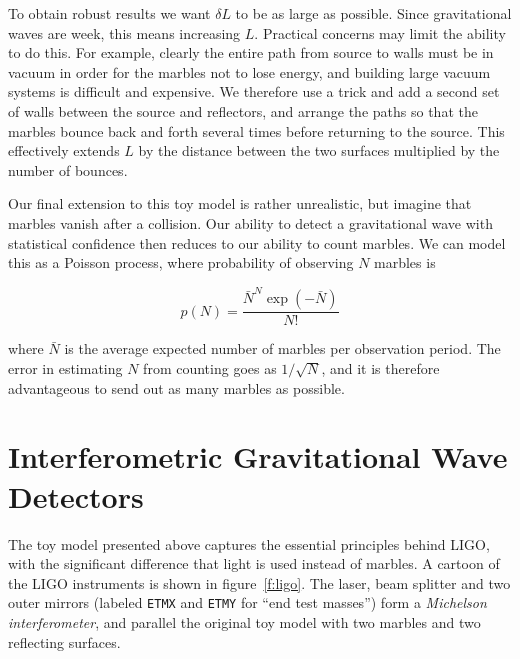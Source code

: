 To obtain robust results we want $\delta L$ to be as large as
possible.  Since gravitational waves are week, this means increasing
$L$.  Practical concerns may limit the ability to do this.  For
example, clearly the entire path from source to walls must be in
vacuum in order for the marbles not to lose energy, and building large
vacuum systems is difficult and expensive.  We therefore use a trick
and add a second set of walls between the source and reflectors, and
arrange the paths so that the marbles bounce back and forth several
times before returning to the source.  This effectively extends $L$ by
the distance between the two surfaces multiplied by the number of
bounces.

Our final extension to this toy model is rather unrealistic, but
imagine that marbles vanish after a collision.  Our ability to detect a
gravitational wave with statistical confidence then reduces to our
ability to count marbles.  We can model this as a Poisson process, where
probability of observing $N$ marbles is 

\begin{equation*}
p(N) = \frac{\bar{N}^N \exp(-\bar{N})} {N!}
\end{equation*}

where $\bar{N}$ is the average expected number of marbles per
observation period.  The error in estimating $N$ from counting goes as
$1/\sqrt{N}$, and it is therefore advantageous to send out as many 
marbles as possible.

\section{Interferometric Gravitational Wave Detectors}

The toy model presented above captures the essential principles behind
LIGO, with the significant difference that light is used instead of
marbles.  A cartoon of the LIGO instruments is shown in
figure~\ref{f:ligo}.  The laser, beam splitter and two outer mirrors
(labeled \texttt{ETMX} and \texttt{ETMY} for ``end test masses'') form
a \emph{Michelson interferometer}, and parallel the original toy model
with two marbles and two reflecting surfaces.



